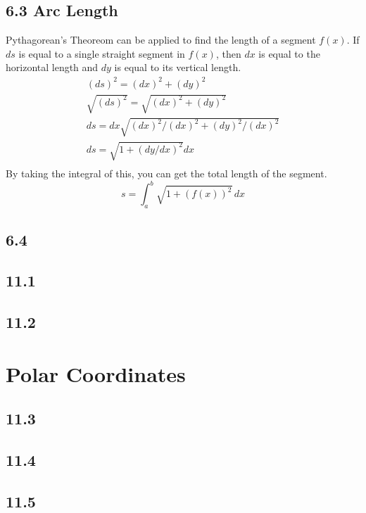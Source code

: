 \documentclass{article}
\begin{document}
        \subsection*{6.3 Arc Length}
            Pythagorean's Theoreom can be applied to find the length of a segment \(f(x)\).
            If \(ds\) is equal to a single straight segment in \(f(x)\), then  \(dx\) is equal to the horizontal length and \(dy\) is equal to its vertical length. 
            \begin{equation}
                \begin{split}
                    (ds)^2 = (dx)^2 + (dy)^2 \\
                    \sqrt{(ds)^2} = \sqrt{(dx)^2 + (dy)^2}\\
                    ds = dx  \sqrt{(dx)^2 / (dx)^2 + (dy)^2 / (dx) ^2}\\
                    ds = \sqrt{1 + (dy/dx)^2}dx\\
                \end{split}
            \end{equation}
            By taking the integral of this, you can get the total length of the segment.
            \begin{equation}
                s = \int_a^b \sqrt{1 + (f(x))^2} \, dx
            \end{equation}
        \color{Black}
        \subsection*{6.4}
        \subsection*{11.1}
        \subsection*{11.2}
    \section{Polar Coordinates}
        \subsection*{11.3}
        \subsection*{11.4}
        \subsection*{11.5}
\end{document}
